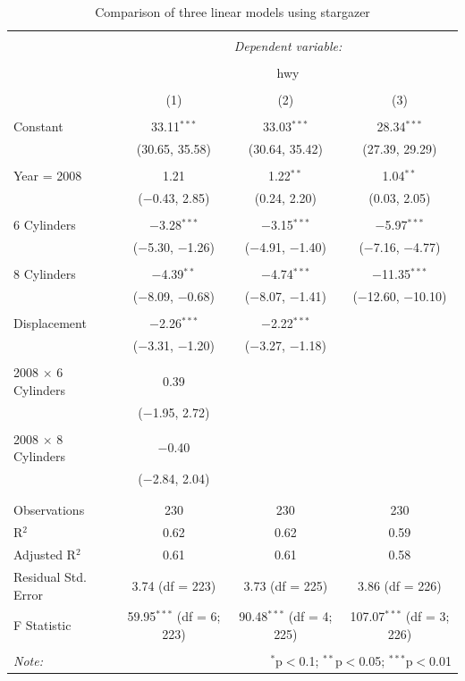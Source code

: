 \documentclass[
  11pt,
  a4paper,
  twoside]{scrbook}
\begin{document}
\linespread{1}
\begin{table}[H] \centering 
  \caption{Comparison of three linear models using stargazer} 
  \label{tab:m123-stargazer} 
\small 
\begin{tabular}{@{\extracolsep{5pt}}lccc} 
\\[-1.8ex]\hline 
\hline \\[-1.8ex] 
 & \multicolumn{3}{c}{\textit{Dependent variable:}} \\ 
\cline{2-4} 
\\[-1.8ex] & \multicolumn{3}{c}{hwy} \\ 
\\[-1.8ex] & (1) & (2) & (3)\\ 
\hline \\[-1.8ex] 
 Constant & 33.11$^{***}$ & 33.03$^{***}$ & 28.34$^{***}$ \\ 
  & (30.65, 35.58) & (30.64, 35.42) & (27.39, 29.29) \\ 
  & & & \\ 
 Year = 2008 & 1.21 & 1.22$^{**}$ & 1.04$^{**}$ \\ 
  & ($-$0.43, 2.85) & (0.24, 2.20) & (0.03, 2.05) \\ 
  & & & \\ 
 6 Cylinders & $-$3.28$^{***}$ & $-$3.15$^{***}$ & $-$5.97$^{***}$ \\ 
  & ($-$5.30, $-$1.26) & ($-$4.91, $-$1.40) & ($-$7.16, $-$4.77) \\ 
  & & & \\ 
 8 Cylinders & $-$4.39$^{**}$ & $-$4.74$^{***}$ & $-$11.35$^{***}$ \\ 
  & ($-$8.09, $-$0.68) & ($-$8.07, $-$1.41) & ($-$12.60, $-$10.10) \\ 
  & & & \\ 
 Displacement & $-$2.26$^{***}$ & $-$2.22$^{***}$ &  \\ 
  & ($-$3.31, $-$1.20) & ($-$3.27, $-$1.18) &  \\ 
  & & & \\ 
 2008 $\times$ 6 Cylinders & 0.39 &  &  \\ 
  & ($-$1.95, 2.72) &  &  \\ 
  & & & \\ 
 2008 $\times$ 8 Cylinders & $-$0.40 &  &  \\ 
  & ($-$2.84, 2.04) &  &  \\ 
  & & & \\ 
\hline \\[-1.8ex] 
Observations & 230 & 230 & 230 \\ 
R$^{2}$ & 0.62 & 0.62 & 0.59 \\ 
Adjusted R$^{2}$ & 0.61 & 0.61 & 0.58 \\ 
Residual Std. Error & 3.74 (df = 223) & 3.73 (df = 225) & 3.86 (df = 226) \\ 
F Statistic & 59.95$^{***}$ (df = 6; 223) & 90.48$^{***}$ (df = 4; 225) & 107.07$^{***}$ (df = 3; 226) \\ 
\hline 
\hline \\[-1.8ex] 
\textit{Note:}  & \multicolumn{3}{r}{$^{*}$p$<$0.1; $^{**}$p$<$0.05; $^{***}$p$<$0.01} \\ 
\end{tabular} 
\end{table}
\end{document}
